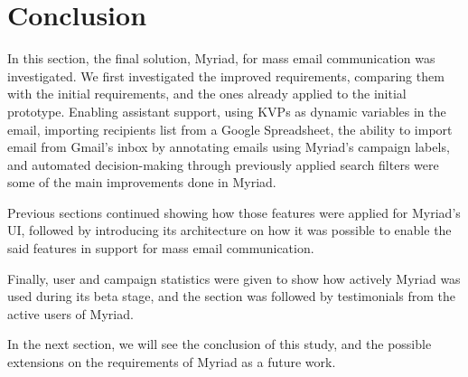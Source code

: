 \section{Conclusion}
\label{sec:5.5:Conc}

In this section, the final solution, Myriad, for mass email communication was investigated. We first investigated the improved requirements, comparing them with the initial requirements, and the ones already applied to the initial prototype. Enabling assistant support, using \ac{KVP}s as dynamic variables in the email, importing recipients list from a Google Spreadsheet, the ability to import email from Gmail's inbox by annotating emails using Myriad's campaign labels, and automated decision-making through previously applied search filters were some of the main improvements done in Myriad.
\vspace{1cm}

Previous sections continued showing how those features were applied for Myriad's \ac{UI}, followed by introducing its architecture on how it was possible to enable the said features in support for mass email communication.
\vspace{1cm}

Finally, user and campaign statistics were given to show how actively Myriad was used during its beta stage, and the section was followed by testimonials from the active users of Myriad.
\vspace{1cm}

In the next section, we will see the conclusion of this study, and the possible extensions on the requirements of Myriad as a future work.

